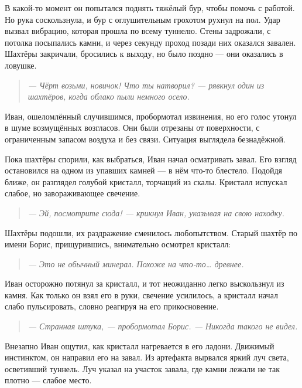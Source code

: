 \documentclass[12pt,a4paper]{book}
\newenvironment{dialogue}{\begin{quote}\itshape}{\end{quote}}
\begin{document}
В какой-то момент он попытался поднять тяжёлый бур, чтобы помочь с работой. Но рука соскользнула, и бур с оглушительным грохотом рухнул на пол. Удар вызвал вибрацию, которая прошла по всему туннелю. Стены задрожали, с потолка посыпались камни, и через секунду проход позади них оказался завален. Шахтёры закричали, бросились к выходу, но было поздно --- они оказались в ловушке.

\begin{dialogue}
--- Чёрт возьми, новичок! Что ты натворил? --- рявкнул один из шахтёров, когда облако пыли немного осело.
\end{dialogue}

Иван, ошеломлённый случившимся, пробормотал извинения, но его голос утонул в шуме возмущённых возгласов. Они были отрезаны от поверхности, с ограниченным запасом воздуха и без связи. Ситуация выглядела безнадёжной.

Пока шахтёры спорили, как выбраться, Иван начал осматривать завал. Его взгляд остановился на одном из упавших камней --- в нём что-то блестело. Подойдя ближе, он разглядел голубой кристалл, торчащий из скалы. Кристалл испускал слабое, но завораживающее свечение.

\begin{dialogue}
--- Эй, посмотрите сюда! --- крикнул Иван, указывая на свою находку.
\end{dialogue}

Шахтёры подошли, их раздражение сменилось любопытством. Старый шахтёр по имени Борис, прищурившись, внимательно осмотрел кристалл:

\begin{dialogue}
--- Это не обычный минерал. Похоже на что-то… древнее.
\end{dialogue}

Иван осторожно потянул за кристалл, и тот неожиданно легко выскользнул из камня. Как только он взял его в руки, свечение усилилось, а кристалл начал слабо пульсировать, словно реагируя на его прикосновение.

\begin{dialogue}
--- Странная штука, --- пробормотал Борис. --- Никогда такого не видел.
\end{dialogue}

Внезапно Иван ощутил, как кристалл нагревается в его ладони. Движимый инстинктом, он направил его на завал. Из артефакта вырвался яркий луч света, осветивший туннель. Луч указал на участок завала, где камни лежали не так плотно --- слабое место.
\end{document}
